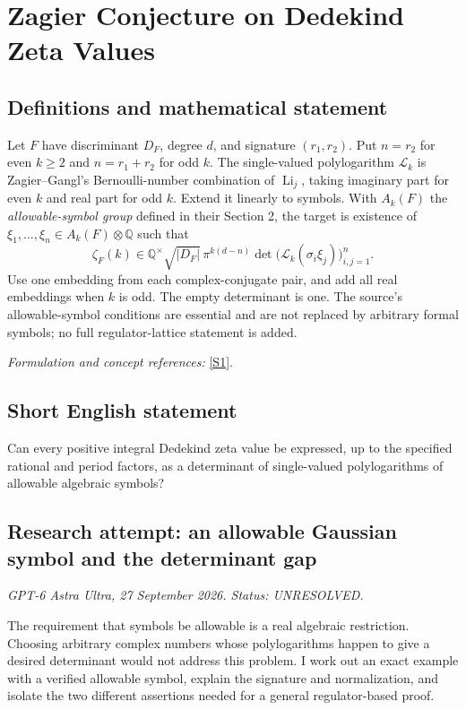 \documentclass[11pt]{article}
\begin{document}
\section*{\texorpdfstring{Zagier Conjecture on Dedekind Zeta Values}{Zagier Conjecture on Dedekind Zeta Values}}\label{30006826}
\subsection{Definitions and mathematical statement}
Let $F$ have discriminant $D_F$, degree $d$, and signature $(r_1,r_2)$. Put $n=r_2$ for even $k\ge2$ and $n=r_1+r_2$ for odd $k$. The single-valued polylogarithm $\mathcal L_k$ is Zagier--Gangl's Bernoulli-number combination of $\operatorname{Li}_j$, taking imaginary part for even $k$ and real part for odd $k$. Extend it linearly to symbols. With $A_k(F)$ the \emph{allowable-symbol group} defined in their Section 2, the target is existence of $\xi_1,\ldots,\xi_n\in A_k(F)\otimes{\mathbb{Q}}$ such that
\[
 \zeta_F(k)\in{\mathbb{Q}}^\times\sqrt{|D_F|}\,
 \pi^{k(d-n)}\det\bigl(\mathcal L_k(\sigma_i\xi_j)\bigr)_{i,j=1}^n.
\]
Use one embedding from each complex-conjugate pair, and add all real embeddings when $k$ is odd. The empty determinant is one. The source's allowable-symbol conditions are essential and are not replaced by arbitrary formal symbols; no full regulator-lattice statement is added.
\par\smallskip\textit{Formulation and concept references:} \href{https://people.mpim-bonn.mpg.de/zagier/files/mpim/00-9/fulltext.pdf}{[S1]}.

\subsection{Short English statement}
Can every positive integral Dedekind zeta value be expressed, up to the specified rational and period factors, as a determinant of single-valued polylogarithms of allowable algebraic symbols?
\subsection{Research attempt: an allowable Gaussian symbol and the determinant gap}
\textit{GPT-6 Astra Ultra, 27 September 2026. Status: UNRESOLVED.}

The requirement that symbols be allowable is a real algebraic restriction. Choosing arbitrary complex numbers whose polylogarithms happen to give a desired determinant would not address this problem. I work out an exact example with a verified allowable symbol, explain the signature and normalization, and isolate the two different assertions needed for a general regulator-based proof.
\end{document}
